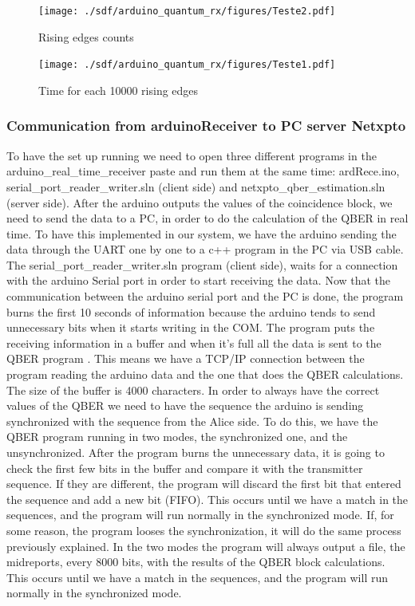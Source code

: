 \begin{refsection}
\begin{figure}[H]
	\centering
	\texttt{[image: ./sdf/arduino\_quantum\_rx/figures/Teste2.pdf]}
	\caption{Rising edges counts}
	\label{montage}
\end{figure}

\begin{figure}[H]
	\centering
	\texttt{[image: ./sdf/arduino\_quantum\_rx/figures/Teste1.pdf]}
	\caption{Time for each 10000 rising edges}
	\label{montage}
\end{figure}
	
	
	\subsubsection{Communication from arduinoReceiver to PC server Netxpto}
	
	To have the set up running we need to open three different programs in the arduino\_real\_time\_receiver paste and run them at the same time: ardRece.ino, serial\_port\_reader\_writer.sln (client side) and netxpto\_qber\_estimation.sln (server side). After the arduino outputs the values of the coincidence block, we need to send the data to a PC, in order to do the calculation of the QBER in real time. To have this implemented in our system, we have the arduino sending the data through the UART one by one to a c++ program in the PC via USB cable. The serial\_port\_reader\_writer.sln program (client side), waits for a connection with the arduino Serial port in order to start receiving the data. Now that the communication between the arduino serial port and the PC is done, the program burns the first 10 seconds of information because the arduino tends to send unnecessary bits when it starts writing in the COM. The program puts the receiving information in a buffer and when it's full all the data is sent to the QBER program . This means we have a TCP/IP connection between the program reading the arduino data and the one that does the QBER calculations. The size of the buffer is 4000 characters. In order to always have the correct values of the QBER we need to have the sequence the arduino is sending synchronized with the sequence from the Alice side. To do this, we have the QBER program running in two modes, the synchronized one, and the unsynchronized. After the program burns the unnecessary data, it is going to check the first few bits in the buffer and compare it with the transmitter sequence. If they are different, the program will discard the first bit that entered the sequence and add a new bit (FIFO). This occurs until we have a match in the sequences, and the program will run normally in the synchronized mode. If, for some reason, the program looses the synchronization, it will do the same process previously explained. In the two modes the program will always  output a file, the midreports, every 8000 bits, with the results of the QBER block calculations. This occurs until we have a match in the sequences, and the program will run normally in the synchronized mode. 
	

\end{refsection}
